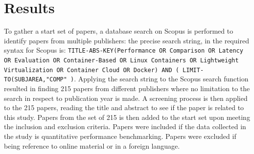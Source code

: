 \section{Results}
To gather a start set of papers, a database search on Scopus \cite{scopus} is performed to identify papers from multiple publishers: the precise search string, in the required syntax for Scopus is: \texttt{TITLE-ABS-KEY(Performance OR Comparison OR Latency OR Evaluation OR Container-Based OR Linux Containers OR Lightweight Virtualization OR Container Cloud OR Docker) AND ( LIMIT-TO(SUBJAREA,"COMP" )}. Applying the search string to the Scopus search function resulted in finding 215 papers from different publishers where no limitation to the search in respect to publication year is made. A screening process is then applied to the 215 papers, reading the title and abstract to see if the paper is related to this study. Papers from the set of 215 is then added to the start set upon meeting the inclusion and exclusion criteria. Papers were included if the data collected in the study is quantitative performance benchmarking. Papers were excluded if being reference to online material or in a foreign language.\\

